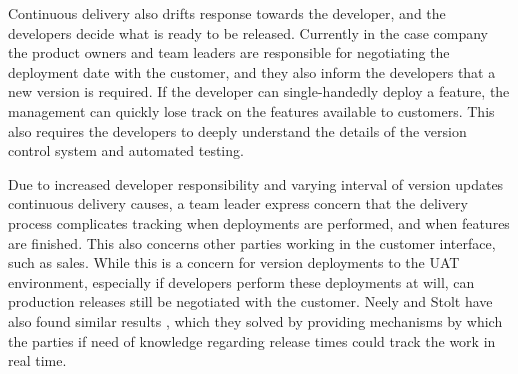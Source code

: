 \documentclass[english, grading]{tktltiki2}
\theoremstyle{definition}
\theoremstyle{remark}
\begin{document}

Continuous delivery also drifts response towards the developer, and the developers decide what is ready to be released. Currently in the case company the product owners and team leaders are responsible for negotiating the deployment date with the customer, and they also inform the developers that a new version is required. If the developer can single-handedly deploy a feature, the management can quickly lose track on the features available to customers. This also requires the developers to deeply understand the details of the version control system and automated testing. 

Due to increased developer responsibility and varying interval of version updates continuous delivery causes, a team leader express concern that the delivery process complicates tracking when deployments are performed, and when features are finished. This also concerns other parties working in the customer interface, such as sales. While this is a concern for version deployments to the UAT environment, especially if developers perform these deployments at will, can production releases still be negotiated with the customer. Neely and Stolt have also found similar results \cite{neely2013continuous}, which they solved by providing mechanisms by which the parties if need of knowledge regarding release times could track the work in real time.  



\end{document}
